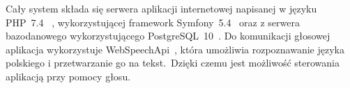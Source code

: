 Cały system składa się serwera aplikacji internetowej napisanej w języku PHP~7.4~\cite{Php2023} , wykorzystującej framework Symfony~5.4~\cite{Sym2023} oraz z serwera bazodanowego wykorzystującego PostgreSQL~10~\cite{Pos023}. Do komunikacji głosowej aplikacja wykorzystuje WebSpeechApi~\cite{WebSpeechApi}, która umożliwia rozpoznawanie języka polskiego i przetwarzanie go na tekst.\ Dzięki czemu jest możliwość sterowania aplikacją przy pomocy głosu.